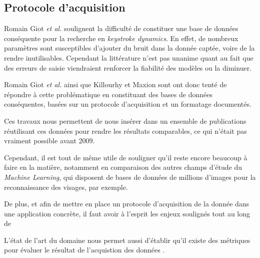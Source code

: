 \subsection{Protocole d'acquisition}

Romain Giot \textit{et al.} \cite{giotGREYC} soulignent la difficulté de constituer une base de données conséquente pour la recherche en \textit{keystroke dynamics}. En effet, de nombreux paramètres sont susceptibles d'ajouter du bruit dans la donnée captée, voire de la rendre inutilisables. Cependant la littérature n'est pas unanime quant au fait que des erreurs de saisie viendraient renforcer la fiabilité des modèles ou la diminuer.

Romain Giot \textit{et al.} \cite{giotGREYC} ainsi que Killourhy et Maxion \cite{killourhy2009} sont ont donc tenté de répondre à cette problématique en constituant des bases de données conséquentes, basées sur un protocole d'acquisition et un formatage documentés.

Ces travaux nous permettent de nous insérer dans un ensemble de publications réutilisant ces données pour rendre les résultats comparables, ce qui n'était pas vraiment possible avant 2009.

Cependant, il est tout de même utile de souligner qu'il reste encore beaucoup à faire en la matière, notamment en comparaison des autres champs d'étude du \textit{Machine Learning}, qui disposent de bases de données de millions d'images pour la reconnaissance des visages, par exemple.

De plus, et afin de mettre en place un protocole d'acquisition de la donnée dans une application concrète, il faut avoir à l'esprit les enjeux soulignés tout au long de 

L'état de l'art du domaine nous permet aussi d'établir qu'il existe des métriques pour évaluer le résultat de l'acquistion des données \cite{giotWeb}.